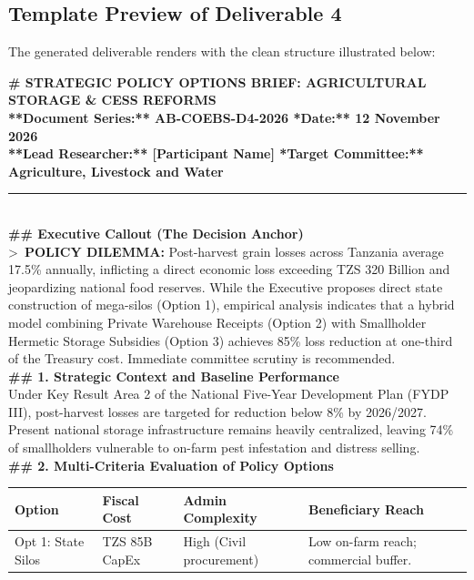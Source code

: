 \documentclass[11pt, a4paper]{report}
\begin{document}
\subsection{Template Preview of Deliverable 4}
The generated deliverable renders with the clean structure illustrated below:

\begin{tcolorbox}[colback=lightgrey, colframe=bordergrey, title=\textbf{Deliverable 4 Preview: \texttt{Day4\_Strategic\_Policy\_Options.md}}]
\small
\textbf{\# STRATEGIC POLICY OPTIONS BRIEF: AGRICULTURAL STORAGE \& CESS REFORMS}\\
\textbf{**Document Series:** AB-COEBS-D4-2026 \quad \textbar{} \quad **Date:** 12 November 2026}\\
\textbf{**Lead Researcher:** [Participant Name] \quad \textbar{} \quad **Target Committee:** Agriculture, Livestock and Water}\\[0.2cm]
\rule{\textwidth}{0.4pt}\\[0.2cm]
\textbf{\#\# Executive Callout (The Decision Anchor)}\\
\textgreater\ \textbf{POLICY DILEMMA:} Post-harvest grain losses across Tanzania average 17.5\% annually, inflicting a direct economic loss exceeding TZS 320 Billion and jeopardizing national food reserves. While the Executive proposes direct state construction of mega-silos (Option 1), empirical analysis indicates that a hybrid model combining Private Warehouse Receipts (Option 2) with Smallholder Hermetic Storage Subsidies (Option 3) achieves 85\% loss reduction at one-third of the Treasury cost. Immediate committee scrutiny is recommended.\\[0.2cm]
\textbf{\#\# 1. Strategic Context and Baseline Performance}\\
Under Key Result Area 2 of the National Five-Year Development Plan (FYDP III), post-harvest losses are targeted for reduction below 8\% by 2026/2027. Present national storage infrastructure remains heavily centralized, leaving 74\% of smallholders vulnerable to on-farm pest infestation and distress selling.\\[0.2cm]
\textbf{\#\# 2. Multi-Criteria Evaluation of Policy Options}\\
\begin{tabular}{p{2.2cm}p{2.6cm}p{3.2cm}p{3.8cm}}
\toprule
\textbf{Option} & \textbf{Fiscal Cost} & \textbf{Admin Complexity} & \textbf{Beneficiary Reach} \\
\midrule
Opt 1: State Silos & TZS 85B CapEx & High (Civil procurement) & Low on-farm reach; commercial buffer. \\

\end{tabular}
\end{tcolorbox}
\end{document}
